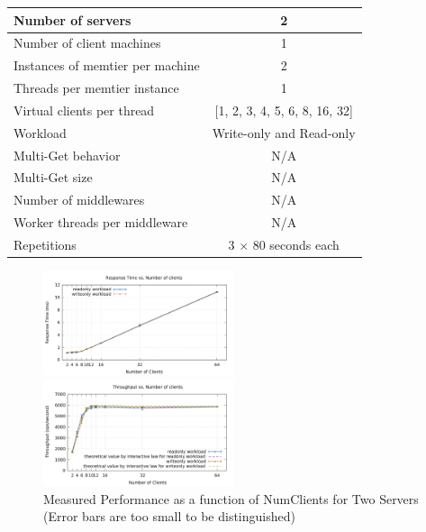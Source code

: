 
\begin{center}
	\scriptsize{
		\begin{tabular}{|l|c|}
			\hline Number of servers                & 2                        \\ 
			\hline Number of client machines        & 1                        \\ 
			\hline Instances of memtier per machine & 2                        \\ 
			\hline Threads per memtier instance     & 1                        \\
			\hline Virtual clients per thread       & [1, 2, 3, 4, 5, 6, 8, 16, 32]                  \\ 
			\hline Workload                         & Write-only and Read-only \\
			\hline Multi-Get behavior               & N/A                      \\
			\hline Multi-Get size                   & N/A                      \\
			\hline Number of middlewares            & N/A                      \\
			\hline Worker threads per middleware    & N/A                      \\
			\hline Repetitions                      & 3 $\times$ 80 seconds each             \\ 
			\hline 
		\end{tabular}
	} 
\end{center}

\begin{figure}[!h]
\parbox{.5\linewidth}{
\centering
\includegraphics[width=0.5\textwidth]{img/2_2_responsetime.png}
}
\parbox{.5\linewidth}{
\centering
\includegraphics[width=0.5\textwidth]{img/2_2_throughput.png}
}
\captionsetup{justification=centering}
\caption{\label{fig:2.2}Measured Performance as a function of NumClients for Two Servers \\(Error bars are too small to be distinguished)}
\end{figure}

